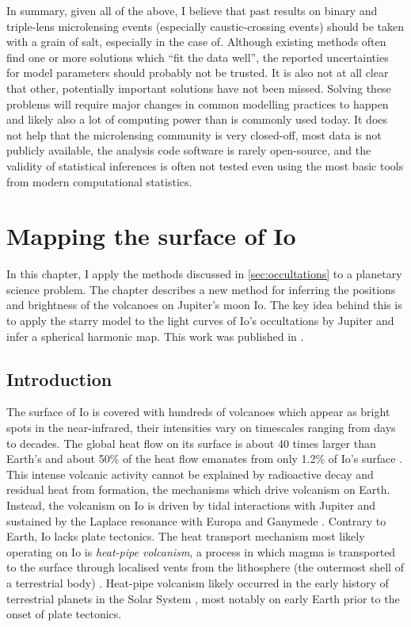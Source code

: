 \documentclass[12pt,dvipsnames]{report}
\newcommand{\ssf}[1]{\textsf{#1}}
\begin{document}
In summary, given all of the above, I believe that past results on binary and triple-lens 
microlensing events (especially caustic-crossing events) should be taken with a grain of salt, 
especially in the case of. 
Although existing methods often find one or more solutions which 
``fit the data well'', the reported uncertainties for 
model parameters should probably not be trusted. 
It is also not at all clear that other, 
potentially important solutions have not been missed. Solving these problems will require 
major changes in common modelling practices to happen and likely also a lot of computing power than 
is commonly used today. It does
not help that the microlensing community is very closed-off, most data is not 
publicly available, the analysis code software is rarely open-source, and the validity of 
statistical inferences is often not tested even using the most basic tools from modern 
computational statistics.

\chapter{Mapping the surface of Io}
\label{ch:io}
In this chapter, I apply the methods discussed in \ref{sec:occultations} to a planetary 
science problem. The chapter describes a new method for inferring the positions and 
brightness of the volcanoes on Jupiter's moon Io. The key idea behind this is to apply the 
\ssf{starry} model to the light curves of Io's occultations by Jupiter and 
infer a spherical harmonic map. This work was published in \citet{2022PSJ.....3...67B}.

\section{Introduction}
The surface of Io is covered with hundreds of volcanoes which appear as bright spots in 
the near-infrared, their intensities vary on timescales ranging from days to decades.
The global heat flow on its surface is about 40 times larger than Earth's 
\citep{2007plmo.book..299B,2010SolE....1....5D} and about 50\% of the heat flow 
emanates from only 1.2\% 
of Io's surface \citep{2012Icar..219..701V}.
This intense volcanic activity cannot be explained by radioactive decay and residual 
heat from formation, the mechanisms which  drive volcanism on Earth.
Instead, the volcanism on Io is driven by tidal interactions with Jupiter and sustained 
by the Laplace resonance with Europa and Ganymede \citep{1979Sci...203..892P}.
Contrary to Earth, Io lacks plate tectonics.
The heat transport mechanism most likely operating on Io is \emph{heat-pipe volcanism}, 
a process in which magma is transported to the surface through localised vents from 
the lithosphere  (the outermost shell of a terrestrial body) \citep{1981GeoRL...8..313O}.
Heat-pipe volcanism likely occurred in the early history of terrestrial planets in the 
Solar System \citep{1981GeoRL...8..313O,2007plmo.book..299B}, most notably on early Earth 
prior to the onset of plate tectonics.
\end{document}
